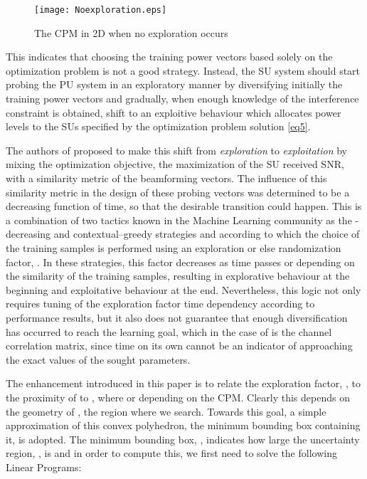\documentclass[journal]{IEEEtran}
\begin{document}
\begin{figure}[ht!]
\centering
\texttt{[image: Noexploration.eps]}
\caption{The CPM in 2D when no exploration occurs}
\label{fig2}
\end{figure}

This indicates that choosing the training power vectors based solely on the optimization problem is not a good strategy. Instead, the SU system should start probing the PU system in an exploratory manner by diversifying initially the training power vectors and gradually, when enough knowledge of the interference constraint is obtained, shift to an exploitive behaviour which allocates power levels to the SUs specified by the optimization problem solution \eqref{eq5}.

The authors of \cite{biban73} proposed to make this shift from \textit{exploration} to \textit{exploitation} by mixing the optimization objective, the maximization of the SU received SNR, with a similarity metric of the beamforming vectors. The influence of this similarity metric in the design of these probing vectors was determined to be a decreasing function of time, so that the desirable transition could happen. This is a combination of two tactics known in the Machine Learning community as the -decreasing and contextual--greedy strategies \cite{biban90} and according to which the choice of the training samples is performed using an exploration or else randomization factor, . In these strategies, this factor decreases as time passes or depending on the similarity of the training samples, resulting in explorative behaviour at the beginning and exploitative behaviour at the end. Nevertheless, this logic not only requires tuning of the exploration factor time dependency according to performance results, but it also does not guarantee that enough diversification has occurred to reach the learning goal, which in the case of \cite{biban73} is the channel correlation matrix, since time on its own cannot be an indicator of approaching the exact values of the sought parameters.

The enhancement introduced in this paper is to relate the exploration factor, , to the proximity of  to , where  or  depending on the CPM. Clearly this depends on the geometry of , the region where we search. Towards this goal, a simple approximation of this convex polyhedron, the minimum bounding box containing it, is adopted. The minimum bounding box, , indicates how large the uncertainty region, , is and in order to compute this, we first need to solve the following  Linear Programs:
\end{document}
